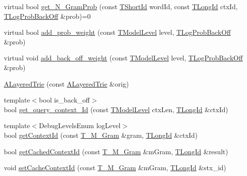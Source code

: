 \begin{DoxyCompactItemize}
\item 
virtual bool \hyperlink{classuva_1_1smt_1_1tries_1_1_a_layered_trie_aa49bc3aaba12ce2be46a611526b55e29}{get\+\_\+\+N\+\_\+\+Gram\+Prob} (const \hyperlink{namespaceuva_1_1smt_1_1hashing_adcf22e1982ad09d3a63494c006267469}{T\+Short\+Id} word\+Id, const \hyperlink{namespaceuva_1_1smt_1_1hashing_a5992ac0dea0fb3226fb403ede09fad55}{T\+Long\+Id} ctx\+Id, \hyperlink{namespaceuva_1_1smt_1_1tries_acd0660255dd9ef5d644f01de49102750}{T\+Log\+Prob\+Back\+Off} \&prob)=0
\item 
virtual bool \hyperlink{classuva_1_1smt_1_1tries_1_1_a_layered_trie_a715fbbe90bbb52d7f86532748ca53d39}{add\+\_\+prob\+\_\+weight} (const \hyperlink{namespaceuva_1_1smt_1_1tries_a20577a44b3a42d26524250634379b7cb}{T\+Model\+Level} level, \hyperlink{namespaceuva_1_1smt_1_1tries_acd0660255dd9ef5d644f01de49102750}{T\+Log\+Prob\+Back\+Off} \&prob)
\item 
virtual void \hyperlink{classuva_1_1smt_1_1tries_1_1_a_layered_trie_a3cd19ce2041e3538ca7628105db1acec}{add\+\_\+back\+\_\+off\+\_\+weight} (const \hyperlink{namespaceuva_1_1smt_1_1tries_a20577a44b3a42d26524250634379b7cb}{T\+Model\+Level} level, \hyperlink{namespaceuva_1_1smt_1_1tries_acd0660255dd9ef5d644f01de49102750}{T\+Log\+Prob\+Back\+Off} \&prob)
\item 
\hyperlink{classuva_1_1smt_1_1tries_1_1_a_layered_trie_a6c09ea7dddd6026939c57137c51d95ca}{A\+Layered\+Trie} (const \hyperlink{classuva_1_1smt_1_1tries_1_1_a_layered_trie}{A\+Layered\+Trie} \&orig)
\item 
{\footnotesize template$<$bool is\+\_\+back\+\_\+off$>$ }\\bool \hyperlink{classuva_1_1smt_1_1tries_1_1_a_layered_trie_a21898c0cea65290daa0731c3dba2ab63}{get\+\_\+query\+\_\+context\+\_\+\+Id} (const \hyperlink{namespaceuva_1_1smt_1_1tries_a20577a44b3a42d26524250634379b7cb}{T\+Model\+Level} ctx\+Len, \hyperlink{namespaceuva_1_1smt_1_1hashing_a5992ac0dea0fb3226fb403ede09fad55}{T\+Long\+Id} \&ctx\+Id)
\item 
{\footnotesize template$<$Debug\+Levels\+Enum log\+Level$>$ }\\bool \hyperlink{classuva_1_1smt_1_1tries_1_1_a_layered_trie_ac55688a5511db1baeb26fd40c75280e4}{get\+Context\+Id} (const \hyperlink{structuva_1_1smt_1_1tries_1_1mgrams_1_1_t___m___gram}{T\+\_\+\+M\+\_\+\+Gram} \&gram, \hyperlink{namespaceuva_1_1smt_1_1hashing_a5992ac0dea0fb3226fb403ede09fad55}{T\+Long\+Id} \&ctx\+Id)
\item 
bool \hyperlink{classuva_1_1smt_1_1tries_1_1_a_layered_trie_abe176a331f754c3b40c01d9b1b71d7b4}{get\+Cached\+Context\+Id} (const \hyperlink{structuva_1_1smt_1_1tries_1_1mgrams_1_1_t___m___gram}{T\+\_\+\+M\+\_\+\+Gram} \&m\+Gram, \hyperlink{namespaceuva_1_1smt_1_1hashing_a5992ac0dea0fb3226fb403ede09fad55}{T\+Long\+Id} \&result)
\item 
void \hyperlink{classuva_1_1smt_1_1tries_1_1_a_layered_trie_a58bb4c04c2b764a98a154922a9b896f0}{set\+Cache\+Context\+Id} (const \hyperlink{structuva_1_1smt_1_1tries_1_1mgrams_1_1_t___m___gram}{T\+\_\+\+M\+\_\+\+Gram} \&m\+Gram, \hyperlink{namespaceuva_1_1smt_1_1hashing_a5992ac0dea0fb3226fb403ede09fad55}{T\+Long\+Id} \&stx\+\_\+id)
\end{DoxyCompactItemize}
